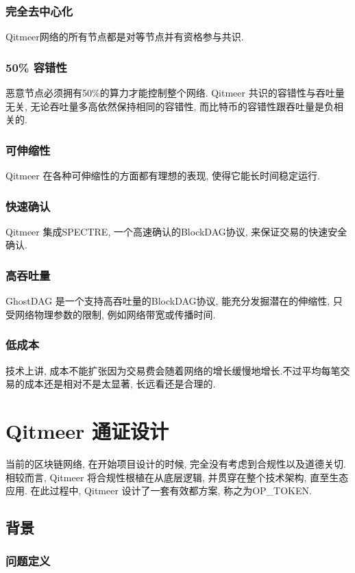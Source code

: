 \documentclass[a4paper,11pt]{article}
\begin{document}
\subsubsection*{完全去中心化}
Qitmeer网络的所有节点都是对等节点并有资格参与共识. 

\subsubsection*{50\% 容错性}
恶意节点必须拥有50\%的算力才能控制整个网络. Qitmeer 共识的容错性与吞吐量无关, 无论吞吐量多高依然保持相同的容错性, 而比特币的容错性跟吞吐量是负相关的.

\subsubsection{可伸缩性}
Qitmeer 在各种可伸缩性的方面都有理想的表现, 使得它能长时间稳定运行.

\subsubsection*{快速确认}
Qitmeer 集成SPECTRE, 一个高速确认的BlockDAG协议, 来保证交易的快速安全确认.
\subsubsection*{高吞吐量}
GhostDAG 是一个支持高吞吐量的BlockDAG协议, 能充分发掘潜在的伸缩性, 只受网络物理参数的限制, 例如网络带宽或传播时间.

\subsubsection*{低成本}
技术上讲, 成本不能扩张因为交易费会随着网络的增长缓慢地增长.不过平均每笔交易的成本还是相对不是太显著, 长远看还是合理的.


\section{Qitmeer 通证设计}

当前的区块链网络, 在开始项目设计的时候, 完全没有考虑到合规性以及道德关切. 相较而言, Qitmeer 将合规性根植在从底层逻辑, 并贯穿在整个技术架构, 直至生态应用. 在此过程中, Qitmeer 设计了一套有效都方案, 称之为OP_TOKEN.

\subsection{背景}
\subsubsection{问题定义}
\end{document}
